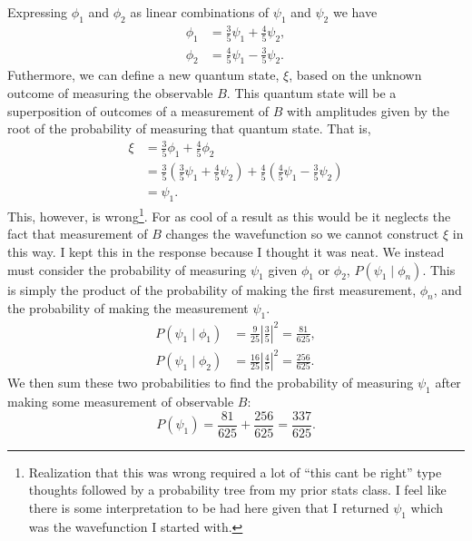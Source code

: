 \documentclass[a4paper, 12pt]{config/homework}
\begin{document}
\begin{enumerate}
\begin{enumerate}[label=(\alph*.)]
Expressing \(\phi_1\) and \(\phi_2\) as linear combinations of \(\psi_1\) and \(\psi_2\) we have
\begin{align*}
\phi_1 &= \frac{3}{5}\psi_1 + \frac{4}{5}\psi_2, \\
\phi_2 &= \frac{4}{5}\psi_1 - \frac{3}{5}\psi_2.
\end{align*}
Futhermore, we can define a new quantum state, \(\xi \), based on the unknown outcome of measuring the observable \(B\). This quantum state will be a superposition of outcomes of a measurement of \(B\) with amplitudes given by the root of the probability of measuring that quantum state. That is,
\begin{align*}
\xi &= \frac{3}{5}\phi_1 + \frac{4}{5}\phi_2
\\&= \frac{3}{5}\left(\frac{3}{5}\psi_1 + \frac{4}{5}\psi_2\right) + \frac{4}{5}\left(\frac{4}{5}\psi_1 - \frac{3}{5}\psi_2\right)
\\&= \psi_1.
\end{align*}
This, however, is wrong\footnote{Realization that this was wrong required a lot of ``this cant be right'' type thoughts followed by a probability tree from my prior stats class. I feel like there is some interpretation to be had here given that I returned \(\psi_1\) which was the wavefunction I started with.}. For as cool of a result as this would be it neglects the fact that measurement of \(B\) changes the wavefunction so we cannot construct \(\xi \) in this way. I kept this in the response because I thought it was neat.
We instead must consider the probability of measuring \(\psi_1\) given \(\phi_1\) or \(\phi_2\), \(P\left(\psi_1 \mid \phi_n\right)\). This is simply the product of the probability of making the first measurement, \(\phi_n\), and the probability of making the measurement \(\psi_1\).
\begin{align*}
P\left(\psi_1 \mid \phi_1\right) &= \frac{9}{25}\left|\frac{3}{5}\right|^2 = \frac{81}{625}, \\
P\left(\psi_1 \mid \phi_2\right) &= \frac{16}{25}\left|\frac{4}{5}\right|^2 = \frac{256}{625}.
\end{align*}
We then sum these two probabilities to find the probability of measuring \(\psi_1\) after making some measurement of observable \(B\):
\[P(\psi_1) = \frac{81}{625} + \frac{256}{625} = \frac{337}{625}.\]

\end{enumerate}
\end{enumerate}
\end{document}
